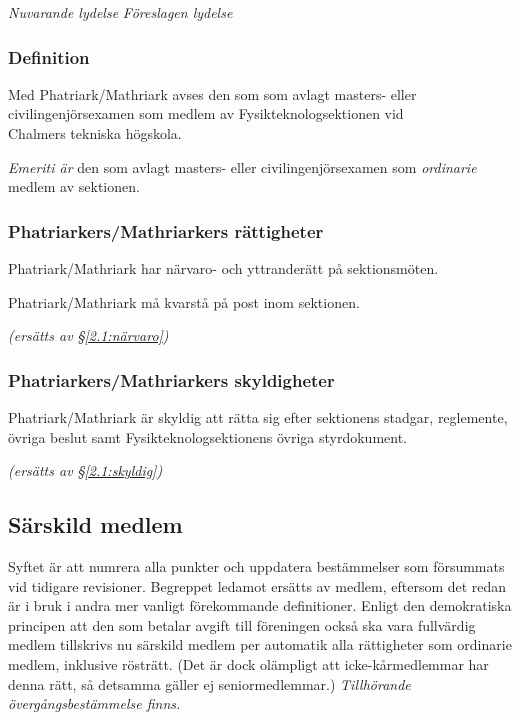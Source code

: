 \documentclass{article}
\newenvironment{lydelse}
    {\begin{paracol}{2}%
        \emph{Nuvarande lydelse}%
        \switchcolumn%
        \emph{Föreslagen lydelse}%
    \end{paracol}%
    \begin{enumerate}[label=\thesubsection.\arabic*]%
    \begin{paracol}{2}%
    }{\end{paracol}\end{enumerate}}
\newcommand{\itemb}{\item[\textbullet]}
\begin{document}
\begin{lydelse}%
  \subsubsection*{Definition}
    \itemb Med Phatriark/Mathriark avses den som som avlagt masters-
  eller civil\-ingenjörs\-examen som medlem av Fysik\-teknolog\-sektionen vid\\
  Ch\-al\-mers tekniska högskola.

  \switchcolumn
  \setcounter{enumi}{0}
    \item \emph{Emeriti är} den som avlagt masters-
       eller civil\-ingenjörs\-examen som \emph{ordinarie} medlem av sektionen.
    
  \switchcolumn*
    \subsubsection*{Phatriarkers/Mathriarkers rättigheter}%
    \itemb Phatriark/Mathriark har närvaro- och yttranderätt på sektionsmöten.

    \itemb Phatriark/Mathriark må kvarstå på post inom sektionen.
    
  \switchcolumn
    \emph{(ersätts av \S \ref{2.1:närvaro})}

  \switchcolumn*
    \subsubsection*{Phatriarkers/Mathriarkers skyldigheter}%
    \itemb Phatriark/Mathriark är skyldig att rätta sig efter sektionens stadgar,
  regle\-mente, övriga beslut samt  Fysikteknologsektionens övriga styrdokument.
    
  \switchcolumn
    \emph{(ersätts av \S \ref{2.1:skyldig})}
\end{lydelse}

\subsection{Särskild medlem}
Syftet är att numrera alla punkter och uppdatera bestämmelser som försummats vid
tidigare revisioner.
Begreppet ledamot ersätts av medlem, eftersom det redan är i bruk i andra mer
vanligt förekommande definitioner.
Enligt den demokratiska principen att den som betalar avgift till föreningen
också ska vara fullvärdig medlem tillskrivs nu särskild medlem per automatik
alla rättigheter som ordinarie medlem, inklusive rösträtt. (Det är dock
olämpligt att icke-kårmedlemmar har denna rätt, så detsamma gäller ej
seniormedlemmar.)
\emph{Tillhörande övergångsbestämmelse finns.}
\end{document}
